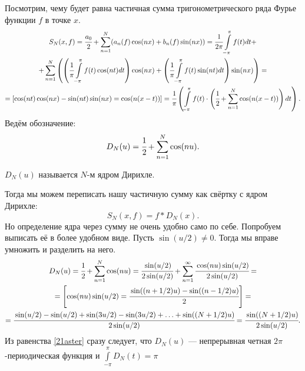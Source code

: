 Посмотрим, чему будет равна частичная сумма тригонометрического ряда Фурье функции $f$ в точке $x$.
\begin{gather}
	S_N(x,f) = \cfrac{a_0}{2} + \sum\limits_{n=1}^{N}(a_n(f) \cos(nx) + b_n(f) \sin(nx)) = \cfrac{1}{2\pi}\int\limits_{-\pi}^{\pi} f(t)dt +\\
	+\sum\limits_{n=1}^{N}\left(\left( \cfrac{1}{\pi}\int\limits_{-\pi}^{\pi}f(t)\cos(nt) dt\right)\cos(nx) +
	\left( \cfrac{1}{\pi}\int\limits_{-\pi}^{\pi}f(t)\sin(nt) dt\right)\sin(nx) \right) = \\
	= [\cos(nt)\cos(nx) - \sin(nt)\sin(nx) = \cos(n(x-t))] 
	=\cfrac{1}{\pi}\left( \int\limits_{-\pi}^{\pi}f(t) \cdot \left( \cfrac{1}{2} + \sum \limits_{n=1}^{N}\cos(n(x-t))\right)dt\right).
\end{gather}
Ведём обозначение:
$$
	D_N(u) = \cfrac{1}{2} + \sum\limits_{n=1}^{N}\cos (nu).
$$
\begin{Def}
	$D_N(u)$ называется $N$-м ядром Дирихле. 
\end{Def}
Тогда мы можем переписать нашу частичную сумму как свёртку с ядром Дирихле:
$$
	S_N(x, f) = f*D_N(x).
    \label{21aster}
$$
Но определение ядра через сумму не очень удобно само по себе. Попробуем выписать её в более удобном виде. Пусть $\sin(u/2) \neq 0$. Тогда мы вправе умножить и разделить на него.
\begin{gather}
	D_N(u) = \cfrac{1}{2} + \sum\limits_{n=1}^{N}\cos(nu) = \cfrac{\sin(u/2)}{2\sin(u/2)} + \sum\limits_{n=1}^{\infty} \cfrac{\cos(nu)\sin(u/2)}{2\sin(u/2)} =\\
	= \left[\cos(nu)\sin(u/2) = \cfrac{\sin((n + 1/2)u) - \sin((n-1/2)u)}{2}\right]=\\
	= \cfrac{\sin(u/2) - \sin(u/2) + \sin(3u/2) - \sin(3u/2) + \ldots + \sin((N + 1/2)u)}{2\sin(u/2)} = \cfrac{\sin((N + 1/2)u)}{2\sin(u/2)}.
\end{gather}
Из равенства \eqref{21aster} сразу следует, что $D_N(u)$ --- непрерывная четная $2\pi$-периодическая функция и $\int\limits_{-\pi}^{\pi}D_N(t) = \pi$